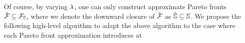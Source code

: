 Of course, by varying $\lambda$, one can only construct approximate
Pareto fronts $\hat{\mathcal{F}_{}} \subseteq \mathcal{F}_{\mathbb{S}}$, where we denote the downward closure of $\hat{\mathcal{F}_{}}$ as $\hat{\mathbb{S}} \subseteq \mathbb{S}$.
We propose the following high-level algorithm to adapt the above
algorithm to the case where each Pareto front approximation introduces at
